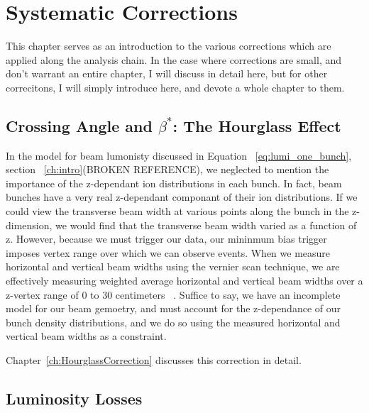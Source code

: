 

\chapter{Systematic Corrections}
\label{ch:SystematicCorrections}

This chapter serves as an introduction to the various corrections which are
applied along the analysis chain. In the case where corrections are small, and
don't warrant an entire chapter, I will discuss in detail here, but for other
correcitons, I will simply introduce here, and devote a whole chapter to them.

\section{Crossing Angle and $\beta^{*}$: The Hourglass Effect}

In the model for beam lumonisty discussed in Equation ~\ref{eq:lumi_one_bunch},
section ~\ref{ch:intro}(BROKEN REFERENCE), we neglected to  mention the importance of the
z-dependant ion distributions in each bunch. In fact, beam bunches have a very
real z-dependant componant of their ion distributions. If we could view the
transverse beam width at various points along the bunch in the z-dimension, we
would find that the transverse beam width varied as a function of z. However,
because we must trigger our data, our mininmum bias trigger imposes vertex range
over which we can observe events.  When we measure horizontal and vertical beam
widths using the vernier scan technique, we are effectively measuring weighted
average horizontal and vertical beam widths over a z-vertex range of 0 to 30
centimeters ~\cite{an888}. Suffice to say, we have an incomplete model for our
beam gemoetry, and must account for the z-dependance of our bunch density
distributions, and we do so using the measured horizontal and vertical beam
widths as a constraint. 

Chapter~\ref{ch:HourglassCorrection} discusses this correction in detail.

\section{Luminosity Losses}

